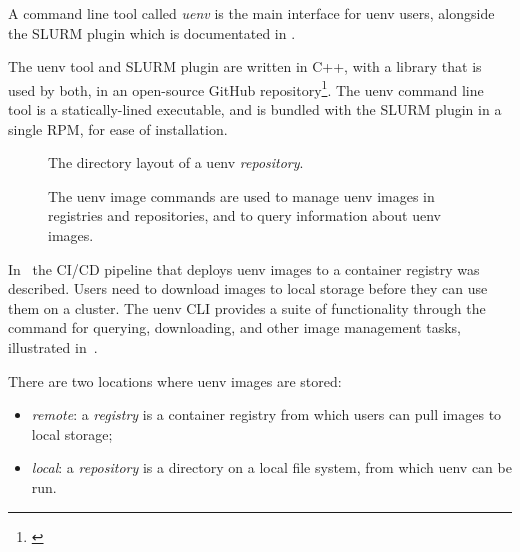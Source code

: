 A command line tool called \emph{uenv} is the main interface for uenv users, alongside the SLURM plugin which is documentated in .

The uenv tool and SLURM plugin are written in C++, with a library that is used by both, in an open-source GitHub repository\footnote{\href{https://github.com/eth-cscs/uenv2}{}}.
The uenv command line tool is a statically-lined executable, and is bundled with the SLURM plugin in a single RPM, for ease of installation.


\begin{figure}[htp!]
    
    \caption{The directory layout of a uenv \emph{repository}.}
    \label{fig:repo-path}
\end{figure}

\begin{figure*}[htp!]
    \begin{center}
        
    \end{center}
    \caption{The uenv image commands are used to manage uenv images in registries and repositories, and to query information about uenv images.}
    \label{fig:uenv-manage}
\end{figure*}

In~ the CI/CD pipeline that deploys uenv images to a container registry was described.
Users need to download images to local storage before they can use them on a cluster.
The uenv CLI provides a suite of functionality through the  command for querying, downloading, and other image management tasks, illustrated in~.

There are two locations where uenv images are stored:
\begin{itemize}
    \item \emph{remote}: a \emph{registry} is a container registry from which users can pull images to local storage;
    \item \emph{local}: a \emph{repository} is a directory on a local file system, from which uenv can be run.
\end{itemize}

